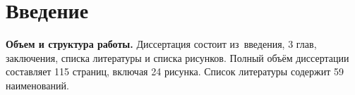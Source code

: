 \chapter*{Введение}                         %

\newcommand{\actuality}{{\textbf\actualityTXT}}
\newcommand{\progress}{}
\newcommand{\aim}{{\textbf\aimTXT}}
\newcommand{\tasks}{\textbf{\tasksTXT}}
\newcommand{\novelty}{\textbf{\noveltyTXT}}
\newcommand{\influence}{\textbf{\influenceTXT}}
\newcommand{\methods}{\textbf{\methodsTXT}}
\newcommand{\defpositions}{\textbf{\defpositionsTXT}}
\newcommand{\reliability}{\textbf{\reliabilityTXT}}
\newcommand{\probation}{\textbf{\probationTXT}}
\newcommand{\contribution}{\textbf{\contributionTXT}}
\newcommand{\publications}{\textbf{\publicationsTXT}}




\textbf{Объем и структура работы.} 
Диссертация состоит из~введения, 
3 глав, заключения, списка литературы и списка рисунков.
Полный объём диссертации составляет
115 страниц, включая
24 рисунка.
Список литературы содержит
59 наименований.


